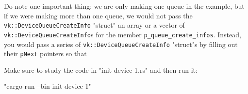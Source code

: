 \documentclass[12pt,letterpaper]{article}
\newcommand{\ril}[1]{\texttt{#1}}
\newcommand{\cil}[1]{\texttt{#1}}
\begin{document}
		Do note one important thing: we are only making one queue in the example, but if we were making more than one queue, we would not pass the \ril{vk::DeviceQueueCreateInfo} "struct" an array or a vector of \ril{vk::DeviceQueueCreateInfo}s for the member \ril{p_queue_create_infos}. Instead, you would pass a series of \ril{vk::DeviceQueueCreateInfo} "struct"s by filling out their \cil{pNext} pointers so that 
		
		Make sure to study the code in "init-device-1.rs" and then run it:
			\begin{center}
				"cargo run --bin init-device-1"
			\end{center}
		
		 
\end{document}
